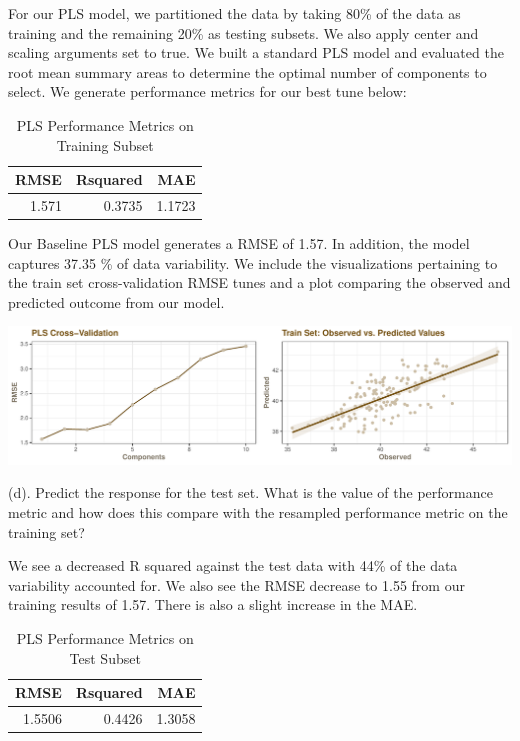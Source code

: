 \documentclass[]{report}
\begin{document}
For our PLS model, we partitioned the data by taking 80\% of the data as
training and the remaining 20\% as testing subsets. We also apply center
and scaling arguments set to true. We built a standard PLS model and
evaluated the root mean summary areas to determine the optimal number of
components to select. We generate performance metrics for our best tune
below:

\begin{table}[H]

\caption{\label{tab:kj-6.3c}PLS Performance Metrics on Training Subset}
\centering
\fontsize{8}{10}\selectfont
\begin{tabular}[t]{rrr}
\toprule
\textbf{RMSE} & \textbf{Rsquared} & \textbf{MAE}\\
\midrule
\rowcolor{gray!6}  1.571 & 0.3735 & 1.1723\\
\bottomrule
\end{tabular}
\end{table}

Our Baseline PLS model generates a RMSE of 1.57. In addition, the model
captures 37.35 \% of data variability. We include the visualizations
pertaining to the train set cross-validation RMSE tunes and a plot
comparing the observed and predicted outcome from our model.

\includegraphics{Homework-Two_files/figure-latex/kj-6.3c2-1.pdf}

\begin{subquestion}{(d).} Predict the response for the test set. What is the value of the performance metric and how does this compare with the resampled performance metric on the training set? 
\end{subquestion}

We see a decreased R squared against the test data with 44\% of the data
variability accounted for. We also see the RMSE decrease to 1.55 from
our training results of 1.57. There is also a slight increase in the
MAE.

\begin{table}[H]

\caption{\label{tab:kj-6.3d-1}PLS Performance Metrics on Test Subset}
\centering
\fontsize{8}{10}\selectfont
\begin{tabular}[t]{rrr}
\toprule
\textbf{RMSE} & \textbf{Rsquared} & \textbf{MAE}\\
\midrule
\rowcolor{gray!6}  1.5506 & 0.4426 & 1.3058\\
\bottomrule
\end{tabular}
\end{table}
\end{document}
